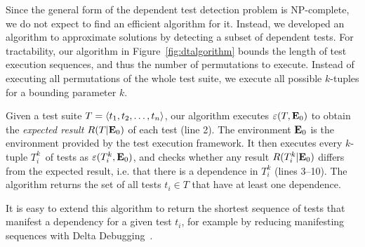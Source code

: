 
\newcommand{\testlist}[0]{\ensuremath{T^k_i}}
\newcommand{\executeTestsInOrder}[1]{\result{#1}{\env_0}}
Since the general form of the dependent test detection problem is
NP-complete, we do not expect to find an efficient algorithm for it.
Instead, we developed an algorithm to approximate solutions by
detecting a subset of dependent
tests. %
For tractability, our algorithm in Figure~\ref{fig:dtalgorithm} bounds the length of
test execution sequences, and thus the number of permutations to
execute. Instead of executing all permutations of the
whole test suite, we execute all possible $k$-tuples for a bounding
parameter $k$.

Given a test suite $T =  \langle t_1, t_2, \ldots, t_n \rangle $, our algorithm
executes $\varepsilon(T,\mathbf{E}_0)$ to obtain the \emph{expected result}
$R(T|\mathbf{E}_0)$ of each test (line 2). The environment $\mathbf{E}_0$
is the environment provided by the test execution framework.
It then executes every $k$-tuple \testlist\ of tests as
$\exec{\testlist}{\env_0}$, and 
checks whether any result $\result{\testlist}{\env_0}$ differs
from the expected result, i.e.
that there is a dependence in $\testlist$
(lines 3--10). The algorithm returns the set of all tests $t_i \in T$
that have at least one dependence.

It is easy to extend this algorithm to return the shortest sequence of
tests that manifest a dependency for a given test $t_i$, for example
by reducing manifesting sequences with Delta
Debugging~\cite{Zeller:2002}.


